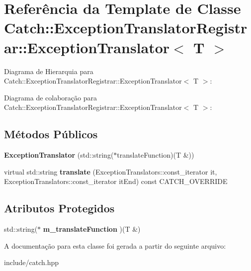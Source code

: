 \hypertarget{classCatch_1_1ExceptionTranslatorRegistrar_1_1ExceptionTranslator}{}\section{Referência da Template de Classe Catch\+:\+:Exception\+Translator\+Registrar\+:\+:Exception\+Translator$<$ T $>$}
\label{classCatch_1_1ExceptionTranslatorRegistrar_1_1ExceptionTranslator}


Diagrama de Hierarquia para Catch\+:\+:Exception\+Translator\+Registrar\+:\+:Exception\+Translator$<$ T $>$\+:


Diagrama de colaboração para Catch\+:\+:Exception\+Translator\+Registrar\+:\+:Exception\+Translator$<$ T $>$\+:
\subsection*{Métodos Públicos}
\begin{DoxyCompactItemize}
\item 
{\bfseries Exception\+Translator} (std\+::string($\ast$translate\+Function)(T \&))\hypertarget{classCatch_1_1ExceptionTranslatorRegistrar_1_1ExceptionTranslator_a2de4e9bcaad47996159763e69f614d7a}{}\label{classCatch_1_1ExceptionTranslatorRegistrar_1_1ExceptionTranslator_a2de4e9bcaad47996159763e69f614d7a}

\item 
virtual std\+::string {\bfseries translate} (Exception\+Translators\+::const\+\_\+iterator it, Exception\+Translators\+::const\+\_\+iterator it\+End) const C\+A\+T\+C\+H\+\_\+\+O\+V\+E\+R\+R\+I\+DE\hypertarget{classCatch_1_1ExceptionTranslatorRegistrar_1_1ExceptionTranslator_a01871d12bd12521192d6c2a505ba54b6}{}\label{classCatch_1_1ExceptionTranslatorRegistrar_1_1ExceptionTranslator_a01871d12bd12521192d6c2a505ba54b6}

\end{DoxyCompactItemize}
\subsection*{Atributos Protegidos}
\begin{DoxyCompactItemize}
\item 
std\+::string($\ast$ {\bfseries m\+\_\+translate\+Function} )(T \&)\hypertarget{classCatch_1_1ExceptionTranslatorRegistrar_1_1ExceptionTranslator_a488013ff0869785c9d041443fbf9a757}{}\label{classCatch_1_1ExceptionTranslatorRegistrar_1_1ExceptionTranslator_a488013ff0869785c9d041443fbf9a757}

\end{DoxyCompactItemize}


A documentação para esta classe foi gerada a partir do seguinte arquivo\+:\begin{DoxyCompactItemize}
\item 
include/catch.\+hpp\end{DoxyCompactItemize}
